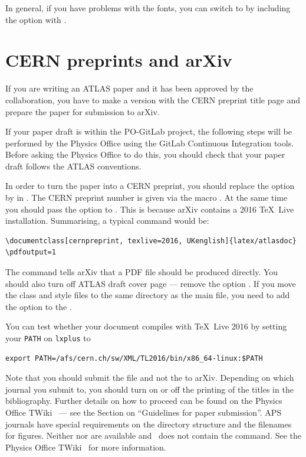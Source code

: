 In general, if you have problems with the  fonts,
you can switch to  by including the option  with .


\section{CERN preprints and arXiv}
\label{sec:preprint}

If you are writing an ATLAS paper and it has been approved by the collaboration,
you have to make a version with the CERN preprint title page and prepare the 
paper for submission to arXiv.

If your paper draft is within the PO-GitLab project, the following steps will be
performed by the Physics Office using the GitLab Continuous Integration tools.
Before asking the Physics Office to do this,
you should check that your paper draft follows the ATLAS conventions.

In order to turn the paper into a CERN preprint,
you should replace the option  by  in .
The CERN preprint number is given via the macro .
At the same time you should pass the option  to
.
This is because arXiv contains a 2016 \TeX\ Live installation.
Summarising, a typical  command would be:
\begin{verbatim}
\documentclass[cernpreprint, texlive=2016, UKenglish]{latex/atlasdoc}
\pdfoutput=1
\end{verbatim}
The  command tells arXiv that a PDF file should be produced directly.
You should also turn off ATLAS draft cover page --- remove the option .
If you move the class and style files to the same directory as the main file,
you need to add the option  to the .

You can test whether your document compiles with \TeX\ Live 2016 by setting your \texttt{PATH} on \texttt{lxplus} to
\begin{verbatim}
export PATH=/afs/cern.ch/sw/XML/TL2016/bin/x86_64-linux:$PATH
\end{verbatim}

Note that you should submit the  file and not the  to arXiv.
Depending on which journal you submit to, you should turn on or off the printing of the titles in the bibliography.
Further details on how to proceed can be found on the Physics Office TWiki~\cite{atlas-physicsoffice} --- see
the Section on \enquote{Guidelines for paper submission}.
APS journals have special requirements on the directory structure and the filenames for figures.
Neither  nor  are available
and \KOMAScript\ does not contain the  command.
See the Physics Office TWiki~\cite{atlas-physicsoffice} for more information.

